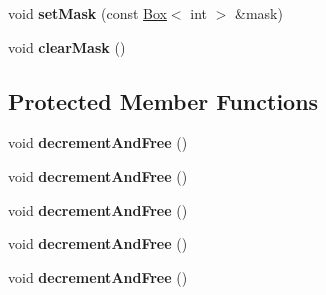 \begin{DoxyCompactItemize}
\item 
\hypertarget{class_ipl_image_wrapper_a63530db687c26bfad23905e042819a11}{
void {\bfseries setMask} (const \hyperlink{class_box}{Box}$<$ int $>$ \&mask)}
\label{class_ipl_image_wrapper_a63530db687c26bfad23905e042819a11}

\item 
\hypertarget{class_ipl_image_wrapper_aa149c09b34b565c2ea31c58251a1d4c3}{
void {\bfseries clearMask} ()}
\label{class_ipl_image_wrapper_aa149c09b34b565c2ea31c58251a1d4c3}

\end{DoxyCompactItemize}
\subsection*{Protected Member Functions}
\begin{DoxyCompactItemize}
\item 
\hypertarget{class_ipl_image_wrapper_af29893e3d99b0eea16b0194805392e9b}{
void {\bfseries decrementAndFree} ()}
\label{class_ipl_image_wrapper_af29893e3d99b0eea16b0194805392e9b}

\item 
\hypertarget{class_ipl_image_wrapper_af29893e3d99b0eea16b0194805392e9b}{
void {\bfseries decrementAndFree} ()}
\label{class_ipl_image_wrapper_af29893e3d99b0eea16b0194805392e9b}

\item 
\hypertarget{class_ipl_image_wrapper_af29893e3d99b0eea16b0194805392e9b}{
void {\bfseries decrementAndFree} ()}
\label{class_ipl_image_wrapper_af29893e3d99b0eea16b0194805392e9b}

\item 
\hypertarget{class_ipl_image_wrapper_af29893e3d99b0eea16b0194805392e9b}{
void {\bfseries decrementAndFree} ()}
\label{class_ipl_image_wrapper_af29893e3d99b0eea16b0194805392e9b}

\item 
\hypertarget{class_ipl_image_wrapper_af29893e3d99b0eea16b0194805392e9b}{
void {\bfseries decrementAndFree} ()}
\label{class_ipl_image_wrapper_af29893e3d99b0eea16b0194805392e9b}

\end{DoxyCompactItemize}
